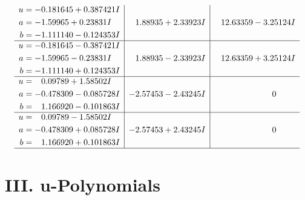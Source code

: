 \documentclass[1p]{elsarticle_modified}
\theoremstyle{definition}
\begin{document}
$$\begin{array}{c|c|c}
\begin{aligned}
u &= -0.181645 + 0.387421 I \\
a &= -1.59965 + 0.23831 I \\
b &= -1.111140 - 0.124353 I\end{aligned}
 & \phantom{-}1.88935 + 2.33923 I & \phantom{-}12.63359 - 3.25124 I \\ \hline\begin{aligned}
u &= -0.181645 - 0.387421 I \\
a &= -1.59965 - 0.23831 I \\
b &= -1.111140 + 0.124353 I\end{aligned}
 & \phantom{-}1.88935 - 2.33923 I & \phantom{-}12.63359 + 3.25124 I \\ \hline\begin{aligned}
u &= \phantom{-}0.09789 + 1.58502 I \\
a &= -0.478309 - 0.085728 I \\
b &= \phantom{-}1.166920 - 0.101863 I\end{aligned}
 & -2.57453 - 2.43245 I & \phantom{-0.000000 } 0 \\ \hline\begin{aligned}
u &= \phantom{-}0.09789 - 1.58502 I \\
a &= -0.478309 + 0.085728 I \\
b &= \phantom{-}1.166920 + 0.101863 I\end{aligned}
 & -2.57453 + 2.43245 I & \phantom{-0.000000 } 0\\
 \hline 
 \end{array}$$\newpage
\newpage\renewcommand{\arraystretch}{1}
\centering \section*{ III. u-Polynomials}
\end{document}
